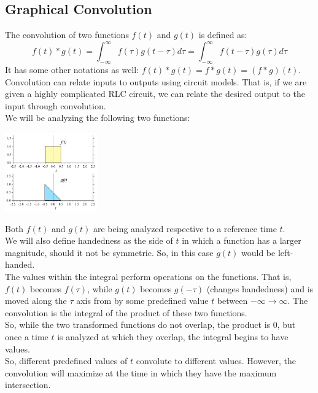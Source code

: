 \documentclass[nobib]{tufte-handout}
\begin{document}
\subsection{Graphical Convolution}
The convolution of two functions $f(t)$ and $g(t)$ is defined as:
\begin{equation*}
    f(t)*g(t) = \int_{-\infty}^{\infty} f(\tau)g(t-\tau)d\tau = \int_{-\infty}^{\infty} f(t-\tau)g(\tau)d\tau
\end{equation*}
It has some other notations as well: $f(t)*g(t)=f*g(t)=(f*g)(t)$.\\
Convolution can relate inputs to outputs using circuit models. That is, if we are given a highly complicated RLC circuit, we can relate the desired output to the input through convolution.\\
We will be analyzing the following two functions:
\begin{center}
    \includegraphics[width = 150px]{images/concolution_funcs.png}
\end{center}
Both $f(t)$ and $g(t)$ are being analyzed respective to a  reference time $t$.\\
We will also define handedness as the side of $t$ in which  a function has a larger magnitude, should it not be symmetric. So, in this case $g(t)$ would be left-handed.\\
The values within the integral perform operations on the functions. That is, $f(t)$ becomes $f(\tau)$, while $g(t)$ becomes $g(-\tau)$ (changes handedness) and is moved along the $\tau$ axis from by some predefined value $t$ between $-\infty\rightarrow\infty$. The convolution is the integral of the product of these two functions.\\
So, while the two transformed functions do not overlap, the product is $0$, but once a time $t$ is analyzed at which they overlap, the integral begins to have values.\\ So, different predefined values of $t$ convolute to different values. However, the convolution will maximize at the time in which they have the maximum intersection.\\
\end{document}
